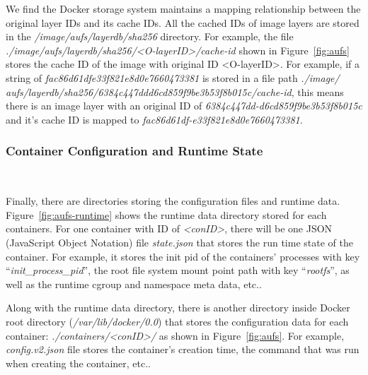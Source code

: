 We find the Docker storage system maintains a mapping relationship between the original layer IDs and its cache IDs. All the cached IDs of image layers are stored in the \textit{/image/aufs/layerdb/sha256} directory.
For example, the file \textit{./image/aufs/layerdb/sha256/<O-layerID>/cache-id} shown in Figure~\ref{fig:aufs} stores the cache ID of the image with original ID <O-layerID>. For example, if a string of \textit{
fac86d61dfe33f821e8d0e7660473381} is stored in a file path \textit{./image/ aufs/layerdb/sha256/6384c447ddd6cd859f9be3b53f8b015c/cache-id}, this means there is an image layer with an original ID of \textit{
6384c447dd-d6cd859f9be3b53f8b015c} and it's cache ID is mapped to \textit{
fac86d61df-e33f821e8d0e7660473381}.



\smallbreak  
\subsubsection{Container Configuration and Runtime State}
~\smallbreak

Finally, there are directories storing the configuration files and runtime data. Figure~\ref{fig:aufs-runtime} shows the runtime data directory stored for each containers. For one container with ID of \textit{<conID>}, there will be one JSON (JavaScript Object Notation)  file \textit{state.json} that stores the run time state of the container. For example, it stores the init pid of the containers' processes with key ``\textit{init\_process\_pid}'', the root file system mount point path with key ``\textit{rootfs}'', as well as the runtime cgroup and namespace meta data, etc.. 

Along with the runtime data directory, there is another directory inside Docker root directory (\textit{/var/lib/docker/0.0}) that stores the configuration data for each container: \textit{./containers/<conID>/} as shown in Figure~\ref{fig:aufs}. For example, \textit{ config.v2.json} file stores the container's creation time, the command that was run when creating the container, etc..



